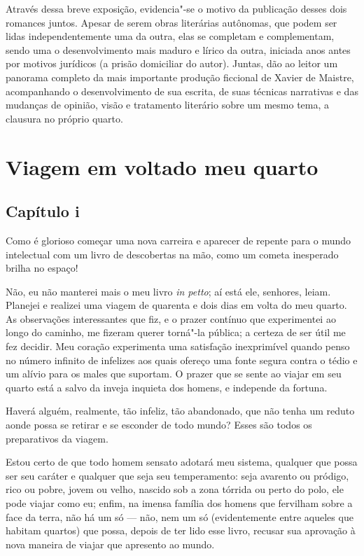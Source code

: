 Através dessa breve exposição, evidencia"-se o motivo da publicação desses dois romances juntos.
Apesar de serem obras literárias autônomas, que podem ser lidas independentemente uma da outra, elas se completam e complementam, sendo uma o desenvolvimento mais maduro e lírico da outra, iniciada anos antes por motivos jurídicos (a prisão domiciliar do autor).
Juntas, dão ao leitor um panorama completo da mais importante produção ficcional de Xavier de Maistre, acompanhando o desenvolvimento de sua escrita, de suas técnicas narrativas e das mudanças de opinião, visão e tratamento literário sobre um mesmo tema, a clausura no próprio quarto.

\chapter[Viagem em volta do meu quarto]{Viagem em volta\break do meu quarto}  


\section*{Capítulo i}

Como é glorioso começar uma nova carreira e aparecer de repente para o
mundo intelectual com um livro de descobertas na mão, como um cometa
inesperado brilha no espaço!

Não, eu não manterei mais o meu livro \textit{in petto}; aí está ele,
senhores, leiam. Planejei e realizei uma viagem de quarenta e dois dias
em volta do meu quarto. As observações interessantes que fiz, e o
prazer contínuo que experimentei ao longo do caminho, me fizeram querer
torná"-la pública; a certeza de ser útil me fez decidir. Meu coração
experimenta uma satisfação inexprimível quando penso no número infinito
de infelizes aos quais ofereço uma fonte segura contra o tédio e um
alívio para os males que suportam. O prazer que se sente ao viajar em
seu quarto está a salvo da inveja inquieta dos homens, e independe da fortuna.

Haverá alguém, realmente, tão infeliz, tão abandonado, que não tenha um
reduto aonde possa se retirar e se esconder de todo mundo? Esses são
todos os preparativos da \mbox{viagem.}

Estou certo de que todo homem sensato adotará meu sistema, qualquer que
possa ser seu caráter e qualquer que seja seu temperamento: seja
avarento ou pródigo, rico ou pobre, jovem ou velho, nascido sob a zona
tórrida ou perto do polo, ele pode viajar como eu; enfim, na imensa
família dos homens que fervilham sobre a face da terra, não há um só
--- não, nem um só (evidentemente entre aqueles que habitam quartos)
que possa, depois de ter lido esse livro, recusar sua aprovação à nova
maneira de viajar que apresento ao mundo.

